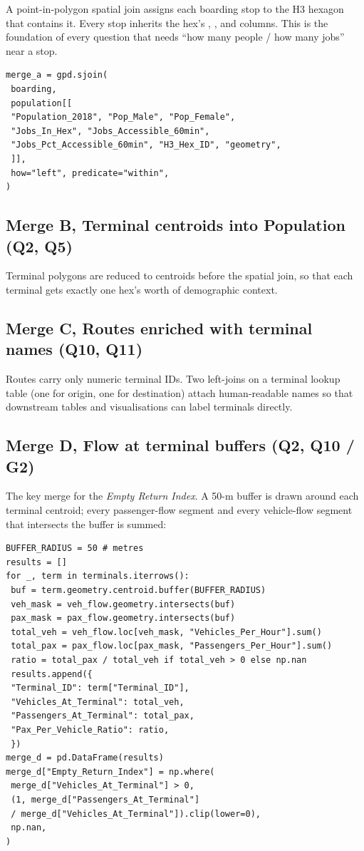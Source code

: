 A point-in-polygon spatial join assigns each boarding stop to the H3
hexagon that contains it. Every stop inherits the hex's
, , and
 columns. This is the foundation of every
question that needs ``how many people / how many jobs'' near a stop.

\begin{lstlisting}[caption={Merge A, point-in-polygon spatial join.}]
merge_a = gpd.sjoin(
 boarding,
 population[[
 "Population_2018", "Pop_Male", "Pop_Female",
 "Jobs_In_Hex", "Jobs_Accessible_60min",
 "Jobs_Pct_Accessible_60min", "H3_Hex_ID", "geometry",
 ]],
 how="left", predicate="within",
)
\end{lstlisting}

\subsection{Merge B, Terminal centroids into Population (Q2, Q5)}

Terminal polygons are reduced to centroids before the spatial join,
so that each terminal gets exactly one hex's worth of demographic
context.

\subsection{Merge C, Routes enriched with terminal names (Q10, Q11)}

Routes carry only numeric terminal IDs. Two left-joins on a terminal
lookup table (one for origin, one for destination) attach human-readable
names so that downstream tables and visualisations can label terminals
directly.

\subsection{Merge D, Flow at terminal buffers (Q2, Q10 / G2)}

The key merge for the \emph{Empty Return Index}. A 50-m buffer is
drawn around each terminal centroid; every passenger-flow segment and
every vehicle-flow segment that intersects the buffer is summed:

\begin{lstlisting}[caption={Merge D, sum vehicle and passenger flow within 50 m of each terminal.}]
BUFFER_RADIUS = 50 # metres
results = []
for _, term in terminals.iterrows():
 buf = term.geometry.centroid.buffer(BUFFER_RADIUS)
 veh_mask = veh_flow.geometry.intersects(buf)
 pax_mask = pax_flow.geometry.intersects(buf)
 total_veh = veh_flow.loc[veh_mask, "Vehicles_Per_Hour"].sum()
 total_pax = pax_flow.loc[pax_mask, "Passengers_Per_Hour"].sum()
 ratio = total_pax / total_veh if total_veh > 0 else np.nan
 results.append({
 "Terminal_ID": term["Terminal_ID"],
 "Vehicles_At_Terminal": total_veh,
 "Passengers_At_Terminal": total_pax,
 "Pax_Per_Vehicle_Ratio": ratio,
 })
merge_d = pd.DataFrame(results)
merge_d["Empty_Return_Index"] = np.where(
 merge_d["Vehicles_At_Terminal"] > 0,
 (1, merge_d["Passengers_At_Terminal"]
 / merge_d["Vehicles_At_Terminal"]).clip(lower=0),
 np.nan,
)
\end{lstlisting}


